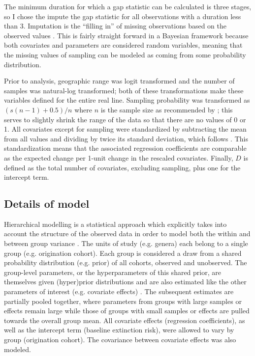 \documentclass[11pt]{article}
\begin{document}
The minimum duration for which a gap statistic can be calculated is three stages, so I chose the impute the gap statistic for all observations with a duration less than 3. Imputation is the ``filling in'' of missing observations based on the observed values \citep{Rubin1996,Gelman2007}. This is fairly straight forward in a Bayesian framework because both covariates and parameters are considered random variables, meaning that the missing values of sampling can be modeled as coming from some probability distribution. 

Prior to analysis, geographic range was logit transformed and the number of samples was natural-log transformed; both of these transformations make these variables defined for the entire real line. Sampling probability was transformed as \((s (n - 1) + 0.5) / n\) where \(n\) is the sample size as recommended by \citet{Smithson2006}; this serves to slightly shrink the range of the data so that there are no values of 0 or 1. All covariates except for sampling were standardized by subtracting the mean from all values and dividing by twice its standard deviation, which follows \citet{Gelman2007}. This standardization means that the associated regression coefficients are comparable as the expected change per 1-unit change in the rescaled covariates. Finally, \(D\) is defined as the total number of covariates, excluding sampling, plus one for the intercept term.



\subsection*{Details of model}

Hierarchical modelling is a statistical approach which explicitly takes into account the structure of the observed data in order to model both the within and between group variance \citep{Gelman2013d,Gelman2007}. The units of study (e.g. genera) each belong to a single group (e.g. origination cohort). Each group is considered a draw from a shared probability distribution (e.g. prior) of all cohorts, observed and unobserved. The group-level parameters, or the hyperparameters of this shared prior, are themselves given (hyper)prior distributions and are also estimated like the other parameters of interest (e.g. covariate effects) \citep{Gelman2013d}. The subsequent estimates are partially pooled together, where parameters from groups with large samples or effects remain large while those of groups with small samples or effects are pulled towards the overall group mean. All covariate effects (regression coefficients), as well as the intercept term (baseline extinction risk), were allowed to vary by group (origination cohort). The covariance between covariate effects was also modeled. 
\end{document}
